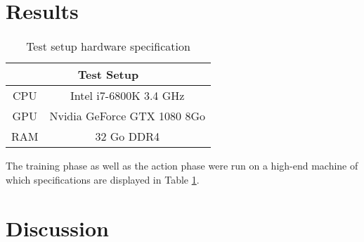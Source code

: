 \documentclass[letterpaper]{article}
\newcommand\Tstrut{\rule{0pt}{2.6ex}}
\begin{document}
\section{Results}
\begin{table}[h]
\centering
\begin{tabular}{cc}
\multicolumn{2}{c}{Test Setup}                         \Tstrut\\ \hline
\multicolumn{1}{c|}{CPU} & Intel i7-6800K 3.4 GHz      \Tstrut\\
\multicolumn{1}{c|}{GPU} & Nvidia GeForce GTX 1080 8Go \Tstrut\\
\multicolumn{1}{c|}{RAM} & 32 Go DDR4                      \Tstrut
\end{tabular}
\caption{Test setup hardware specification}
\label{tab:specs}
\end{table}

The training phase as well as the action phase were run on a high-end machine
of which specifications are displayed in Table \ref{tab:specs}.

\section{Discussion}


\footnotesize


\end{document}
